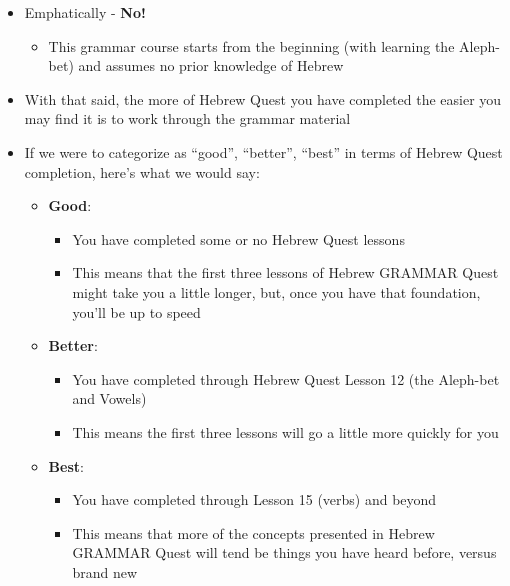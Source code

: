 \documentclass[
]{turabian-researchpaper}
\providecommand{\tightlist}{%
  \setlength{\itemsep}{0pt}\setlength{\parskip}{0pt}}
\begin{document}
\begin{itemize}
\item
  Emphatically - \textbf{No!}

  \begin{itemize}
  \tightlist
  \item
    This grammar course starts from the beginning (with learning the Aleph-bet) and assumes no prior knowledge of Hebrew
  \end{itemize}
\item
  With that said, the more of Hebrew Quest you have completed the easier you may find it is to work through the grammar material
\item
  If we were to categorize as ``good'', ``better'', ``best'' in terms of Hebrew Quest completion, here's what we would say:

  \begin{itemize}
  \tightlist
  \item
    \textbf{Good}:

    \begin{itemize}
    \tightlist
    \item
      You have completed some or no Hebrew Quest lessons\\
    \item
      This means that the first three lessons of Hebrew GRAMMAR Quest might take you a little longer, but, once you have that foundation, you'll be up to speed
    \end{itemize}
  \item
    \textbf{Better}:

    \begin{itemize}
    \tightlist
    \item
      You have completed through Hebrew Quest Lesson 12 (the Aleph-bet and Vowels)\\
    \item
      This means the first three lessons will go a little more quickly for you
    \end{itemize}
  \item
    \textbf{Best}:

    \begin{itemize}
    \tightlist
    \item
      You have completed through Lesson 15 (verbs) and beyond
    \item
      This means that more of the concepts presented in Hebrew GRAMMAR Quest will tend be things you have heard before, versus brand new
    \end{itemize}
  \end{itemize}
\end{itemize}
\end{document}
